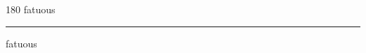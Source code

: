 
\begin{frame}
\begin{center}
\begin{turn}{180}
{\fontsize{2.5cm}{1em}\selectfont fatuous}
\end{turn}
\vspace{1em}\par  
\hrule
\vspace{1em}\par  
{\fontsize{2.5cm}{1em}\selectfont fatuous}
\end{center}
\end{frame}
